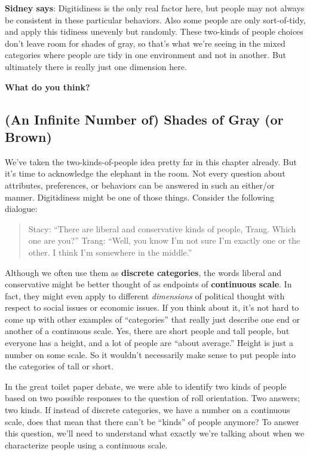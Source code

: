 \documentclass[]{book}
\begin{document}
\textbf{Sidney says}: Digitidiness is the only real factor here, but people may not always be consistent in these particular behaviors. Also some people are only sort-of-tidy, and apply this tidiness unevenly but randomly. These two-kinds of people choices don't leave room for shades of gray, so that's what we're seeing in the mixed categories where people are tidy in one environment and not in another. But ultimately there is really just one dimension here.

\textbf{What do you think?}

\hypertarget{shades}{%
\subsection{(An Infinite Number of) Shades of Gray (or Brown)}\label{shades}}

We've taken the two-kinds-of-people idea pretty far in this chapter already. But it's time to acknowledge the elephant in the room. Not every question about attributes, preferences, or behaviors can be answered in such an either/or manner. Digitidiness might be one of those things. Consider the following dialogue:

\begin{quote}
Stacy: ``There are liberal and conservative kinds of people, Trang. Which one are you?''
Trang: ``Well, you know I'm not sure I'm exactly one or the other. I think I'm somewhere in the middle.''
\end{quote}

Although we often use them as \textbf{discrete categories}, the words liberal and conservative might be better thought of as endpoints of \textbf{continuous scale}. In fact, they might even apply to different \emph{dimensions} of political thought with respect to social issues or economic issues. If you think about it, it's not hard to come up with other examples of ``categories'' that really just describe one end or another of a continuous scale. Yes, there are short people and tall people, but everyone has a height, and a lot of people are ``about average.'' Height is just a number on some scale. So it wouldn't necessarily make sense to put people into the categories of tall or short.

In the great toilet paper debate, we were able to identify two kinds of people based on two possible responses to the question of roll orientation. Two answers; two kinds. If instead of discrete categories, we have a number on a continuous scale, does that mean that there can't be ``kinds'' of people anymore? To answer this question, we'll need to understand what exactly we're talking about when we characterize people using a continuous scale.
\end{document}
